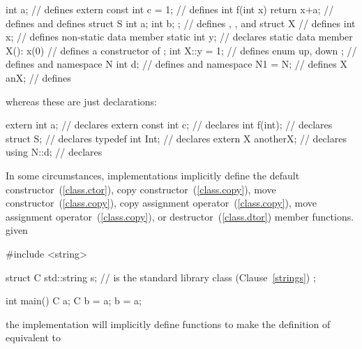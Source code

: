 %
\begin{codeblock}
int a;                          // defines 
extern const int c = 1;         // defines 
int f(int x) { return x+a; }    // defines  and defines 
struct S { int a; int b; };     // defines , , and 
struct X {                      // defines 
  int x;                        // defines non-static data member 
  static int y;                 // declares static data member 
  X(): x(0) { }                 // defines a constructor of 
};
int X::y = 1;                   // defines 
enum { up, down };              // defines  and 
namespace N { int d; }          // defines  and 
namespace N1 = N;               // defines 
X anX;                          // defines 

\end{codeblock}
whereas these are just declarations:
%
\begin{codeblock}
extern int a;                   // declares 
extern const int c;             // declares 
int f(int);                     // declares 
struct S;                       // declares 
typedef int Int;                // declares 
extern X anotherX;              // declares 
using N::d;                     // declares 
\end{codeblock}
\exitexample

\pnum
\enternote 
{}%
In some circumstances, \Cpp implementations implicitly define the
default constructor~(\ref{class.ctor}),
copy constructor~(\ref{class.copy}),
move constructor~(\ref{class.copy}),
copy assignment operator~(\ref{class.copy}),
move assignment operator~(\ref{class.copy}),
or destructor~(\ref{class.dtor}) member functions. \exitnote
\enterexample given

\begin{codeblock}
#include <string>

struct C {
  std::string s;              //  is the standard library class (Clause~\ref{strings})
};

int main() {
  C a;
  C b = a;
  b = a;
}
\end{codeblock}

the implementation will implicitly define functions to make the
definition of  equivalent to

